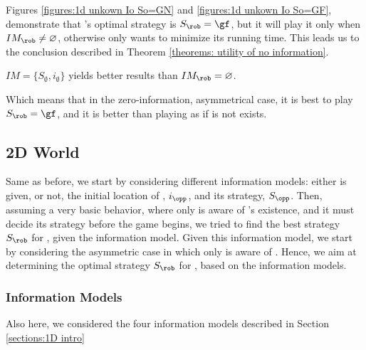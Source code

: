 \documentclass[a4paper,english,10pt]{article}
\begin{document}
Figures \ref{figures:1d unkown Io So=GN} and \ref{figures:1d unkown Io So=GF}, demonstrate that \rob's optimal strategy is $S_\rob=\gf$, but it will play it only when $IM_\rob \neq \varnothing$, otherwise \rob only wants to minimize its running time. This leads us to the conclusion described in Theorem \ref{theorems: utility of no information}.

\begin{theorem}\label{theorems: utility of no information}
$IM=\lbrace S_\emptyset, i_\emptyset \rbrace$ yields better results than $IM_\rob=\varnothing$.
\end{theorem}

Which means that in the zero-information, asymmetrical case, it is best to play $S_\rob=\gf$, and it is better than playing as if \opp is not exists. 

\subsection{2D World}
Same as before, we start by considering different information models: either \rob is given, or not, the initial location of \opp, $i_\opp$, and its strategy, $S_\opp$. Then, assuming a very basic behavior, where only \rob is aware of \opp's existence, and it must decide its strategy before the game begins, we tried to find the best strategy $S_\rob$ for \rob, given the information model.
Given this information model, we start by considering the asymmetric case in which only \rob is aware of \opp. Hence, we aim at determining the optimal strategy $S_\rob$ for \rob, based on the information models.

\subsubsection{Information Models}
Also here, we considered the four information models described in Section \ref{sections:1D intro}
\end{document}
